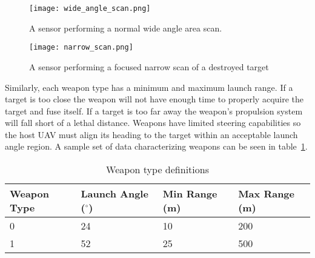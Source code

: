 \begin{figure}[H]
	\centering
	\texttt{[image: wide\_angle\_scan.png]}
	\caption{A sensor performing a normal wide angle area scan.}
	\label{fig:wide_angle_scan}
\end{figure}

\begin{figure}[H]
	\centering
	\texttt{[image: narrow\_scan.png]}
	\caption{A sensor performing a focused narrow scan of a destroyed target}
	\label{fig:narrow_scan}
\end{figure}

Similarly, each weapon type has a minimum and maximum launch range.  If a target is too close the weapon will not have enough time to properly acquire the target and fuse itself.  If a target is too far away the weapon's propulsion system will fall short of a lethal distance.  Weapons have limited steering capabilities so the host UAV must align its heading to the target within an acceptable launch angle region. A sample set of data characterizing weapons can be seen in table~\ref{tab:weaponType}.


\begin{table}[H]
	\caption{Weapon type definitions}
	\centering
	\label{tab:weaponType}
	\begin{tabular}{|p{1.4cm}|p{1.6cm}|p{1.2cm}|p{1.2cm}|}
		\hline
		Weapon Type & Launch Angle ($^{\circ}$) & Min Range (m) & Max Range (m)\\ \hline
		0 & 24 & 10 & 200 \\
		1 & 52 & 25 & 500 \\
		\hline
	\end{tabular}
\end{table}

